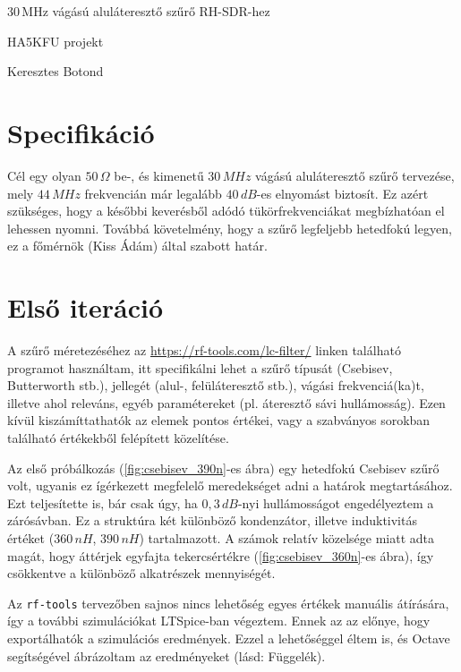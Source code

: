 \begin{center}
	\Huge
	30\,MHz vágású aluláteresztő szűrő RH-SDR-hez
	
	\Large
	HA5KFU projekt
	
	\Large
	Keresztes Botond
\end{center}


\section*{Specifikáció}

Cél egy olyan $50\,\Omega$ be-, és kimenetű $30\,MHz$ vágású aluláteresztő szűrő tervezése, mely $44\,MHz$ frekvencián már legalább $40\,dB$-es elnyomást biztosít. Ez azért szükséges, hogy a későbbi keverésből adódó tükörfrekvenciákat megbízhatóan el lehessen nyomni. Továbbá követelmény, hogy a szűrő legfeljebb hetedfokú legyen, ez a főmérnök (Kiss Ádám) által szabott határ.


\section*{Első iteráció}

A szűrő méretezéséhez az \url{https://rf-tools.com/lc-filter/} linken található programot használtam, itt specifikálni lehet a szűrő típusát (Csebisev, Butterworth stb.), jellegét (alul-, felüláteresztő stb.), vágási frekvenciá(ka)t, illetve ahol releváns, egyéb paramétereket (pl. áteresztő sávi hullámosság). Ezen kívül kiszámíttathatók az elemek pontos értékei, vagy a szabványos sorokban található értékekből felépített közelítése.

Az első próbálkozás (\ref{fig:csebisev_390n}-es ábra) egy hetedfokú Csebisev szűrő volt, ugyanis ez ígérkezett megfelelő meredekséget adni a határok megtartásához. Ezt teljesítette is, bár csak úgy, ha $0,3\,dB$-nyi hullámosságot engedélyeztem a zárósávban. Ez a struktúra két különböző kondenzátor, illetve induktivitás értéket ($360\,nH$, $390\,nH$) tartalmazott. A számok relatív közelsége miatt adta magát, hogy áttérjek egyfajta tekercsértékre (\ref{fig:csebisev_360n}-es ábra), így csökkentve a különböző alkatrészek mennyiségét.

Az \texttt{rf-tools} tervezőben sajnos nincs lehetőség egyes értékek manuális átírására, így a további szimulációkat LTSpice-ban végeztem\footnotemark. Ennek az az előnye, hogy exportálhatók a szimulációs eredmények. Ezzel a lehetőséggel éltem is, és Octave segítségével ábrázoltam az eredményeket (lásd: Függelék).

